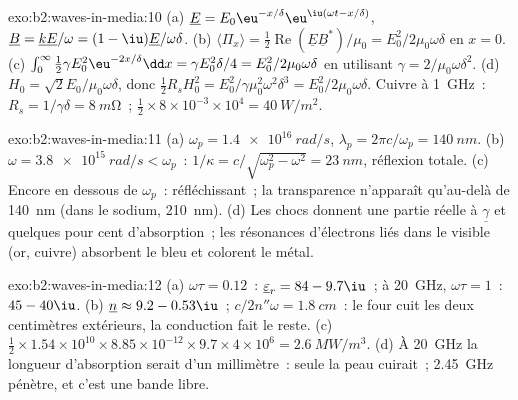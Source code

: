 \begin{solution}{exo:b2:waves-in-media:10}
(a) $\underline E = E_0\eu^{-x/\delta}\eu^{\iu(\omega t - x/\delta)}$, $\underline B = \underline k\underline E/\omega
= (1 - \iu)\underline E/\omega\delta$. (b) $\langle\Pi_x\rangle = \tfrac12\operatorname{Re}(\underline E
\underline B^*)/\mu_0 = E_0^2/2\mu_0\omega\delta$ en $x = 0$. (c) $\int_0^\infty\tfrac12\gamma E_0^2
\eu^{-2x/\delta}\dd x = \gamma E_0^2\delta/4 = E_0^2/2\mu_0\omega\delta$ en utilisant $\gamma = 2/\mu_0\omega\delta^2$.
(d) $H_0 = \sqrt2E_0/\mu_0\omega\delta$, donc $\tfrac12R_sH_0^2 = E_0^2/\gamma\mu_0^2\omega^2\delta^3 =
E_0^2/2\mu_0\omega\delta$. Cuivre à \qty{1}{GHz}~: $R_s = 1/\gamma\delta = \qty{8}{m\ohm}$~;
$\tfrac12 \times 8 \times 10^{-3} \times 10^4 = \qty{40}{W/m^2}$.
\end{solution}

\begin{solution}{exo:b2:waves-in-media:11}
(a) $\omega_p = \qty{1.4e16}{rad/s}$, $\lambda_p = 2\pi c/\omega_p = \qty{140}{nm}$. (b) $\omega = \qty{3.8e15}{rad/s}
< \omega_p$~: $1/\kappa = c/\sqrt{\omega_p^2 - \omega^2} = \qty{23}{nm}$, réflexion totale. (c)
Encore en dessous de $\omega_p$~: réfléchissant~; la transparence n'apparaît qu'au-delà de \qty{140}{nm} (dans le
sodium, \qty{210}{nm}). (d) Les chocs donnent une partie réelle à $\underline\gamma$ et
quelques pour cent d'absorption~; les résonances d'électrons liés dans le visible
(or, cuivre) absorbent le bleu et colorent le métal.
\end{solution}

\begin{solution}{exo:b2:waves-in-media:12}
(a) $\omega\tau = 0.12$~: $\underline\varepsilon_r = 84 - 9.7\iu$~; à \qty{20}{GHz}, $\omega\tau = 1$~:
$45 - 40\iu$. (b) $\underline n \approx 9.2 - 0.53\iu$~; $c/2n''\omega = \qty{1.8}{cm}$~: le four
cuit les deux centimètres extérieurs, la conduction fait le reste. (c) $\tfrac12 \times
1.54 \times 10^{10} \times 8.85 \times 10^{-12} \times 9.7 \times 4 \times 10^6 = \qty{2.6}{MW/m^3}$. (d) À
\qty{20}{GHz} la longueur d'absorption serait d'un millimètre~: seule la peau
cuirait~; \qty{2.45}{GHz} pénètre, et c'est une bande libre.
\end{solution}

